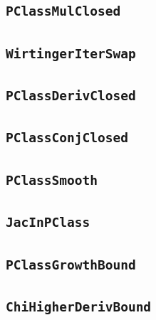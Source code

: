 \documentclass[11pt]{amsart}
\theoremstyle{definition}
\begin{document}
\subsection{\texorpdfstring{\texttt{PClassMulClosed}}{PClassMulClosed}}\label{node:PClassMulClosed}


\subsection{\texorpdfstring{\texttt{WirtingerIterSwap}}{WirtingerIterSwap}}\label{node:WirtingerIterSwap}


\subsection{\texorpdfstring{\texttt{PClassDerivClosed}}{PClassDerivClosed}}\label{node:PClassDerivClosed}


\subsection{\texorpdfstring{\texttt{PClassConjClosed}}{PClassConjClosed}}\label{node:PClassConjClosed}


\subsection{\texorpdfstring{\texttt{PClassSmooth}}{PClassSmooth}}\label{node:PClassSmooth}


\subsection{\texorpdfstring{\texttt{JacInPClass}}{JacInPClass}}\label{node:JacInPClass}


\subsection{\texorpdfstring{\texttt{PClassGrowthBound}}{PClassGrowthBound}}\label{node:PClassGrowthBound}


\subsection{\texorpdfstring{\texttt{ChiHigherDerivBound}}{ChiHigherDerivBound}}\label{node:ChiHigherDerivBound}

\end{document}
